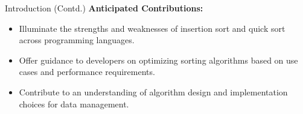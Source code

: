 \begin{frame}{Introduction (Contd.)}
    \textbf{Anticipated Contributions:}
    \begin{itemize}
        \item Illuminate the strengths and weaknesses of insertion sort and quick sort across programming languages.
        \item Offer guidance to developers on optimizing sorting algorithms based on use cases and performance requirements.
        \item Contribute to an understanding of algorithm design and implementation choices for data management.\\
        \cite{2}\cite{3}\cite{4}
    \end{itemize}
\end{frame}
